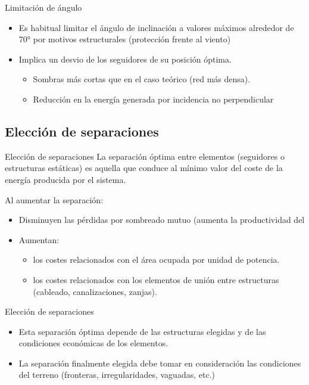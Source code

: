 \documentclass[aspectratio=169, usenames,svgnames,dvipsnames]{beamer}
\begin{document}
\begin{frame}[label={sec:org17b1a79}]{Limitación de ángulo}
\begin{itemize}
\item Es habitual limitar el ángulo de inclinación a valores máximos alrededor de 70° por motivos estructurales (protección frente al viento)

\item Implica un desvio de los seguidores de su posición óptima.

\begin{itemize}
\item Sombras más cortas que en el caso teórico (red más densa).

\item Reducción en la energía generada por incidencia no perpendicular
\end{itemize}
\end{itemize}
\end{frame}

\subsection{Elección de separaciones}
\label{sec:orga24127e}


\begin{frame}[label={sec:orge417d59}]{Elección de separaciones}
La \alert{separación óptima} entre elementos (seguidores o estructuras
estáticas) es aquella que conduce al \alert{mínimo valor del coste de la
energía} producida por el sistema.

Al aumentar la separación:

\begin{itemize}
\item Disminuyen las \alert{pérdidas por sombreado mutuo} (aumenta la
productividad del

\item Aumentan:

\begin{itemize}
\item los \alert{costes relacionados con el área ocupada} por unidad de
potencia.
\item los \alert{costes relacionados con los elementos de unión entre estructuras} (cableado, canalizaciones, zanjas).
\end{itemize}
\end{itemize}
\end{frame}

\begin{frame}[label={sec:org95730fb}]{Elección de separaciones}
\begin{itemize}
\item Esta separación óptima \alert{depende} de las \alert{estructuras elegidas} y de
las \alert{condiciones económicas} de los elementos.

\item La separación finalmente elegida debe \alert{tomar en consideración las
condiciones del terreno} (fronteras, irregularidades, vaguadas, etc.)
\end{itemize}
\end{frame}
\end{document}

